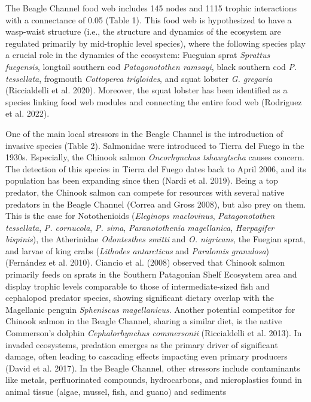 \documentclass[
]{article}
\begin{document}
The Beagle Channel food web includes 145 nodes and 1115 trophic
interactions with a connectance of 0.05 (Table 1). This food web is
hypothesized to have a wasp-waist structure (i.e., the structure and
dynamics of the ecosystem are regulated primarily by mid-trophic level
species), where the following species play a crucial role in the
dynamics of the ecosystem: Fueguian sprat \emph{Sprattus fuegensis},
longtail southern cod \emph{Patagonotothen ramsayi}, black southern cod
\emph{P. tessellata}, frogmouth \emph{Cottoperca trigloides}, and squat
lobster \emph{G. gregaria} (Riccialdelli et al. 2020). Moreover, the
squat lobster has been identified as a species linking food web modules
and connecting the entire food web (Rodriguez et al. 2022).

One of the main local stressors in the Beagle Channel is the
introduction of invasive species (Table 2). Salmonidae were introduced
to Tierra del Fuego in the 1930s. Especially, the Chinook salmon
\emph{Oncorhynchus tshawytscha} causes concern. The detection of this
species in Tierra del Fuego dates back to April 2006, and its population
has been expanding since then (Nardi et al. 2019). Being a top predator,
the Chinook salmon can compete for resources with several native
predators in the Beagle Channel (Correa and Gross 2008), but also prey
on them. This is the case for Notothenioids (\emph{Eleginops
maclovinus}, \emph{Patagonotothen tessellata}, \emph{P. cornucola},
\emph{P. sima}, \emph{Paranotothenia magellanica}, \emph{Harpagifer
bispinis}), the Atherinidae \emph{Odontesthes smitti} and \emph{O.
nigricans}, the Fuegian sprat, and larvae of king crabs (\emph{Lithodes
antarcticus} and \emph{Paralomis granulosa}) (Fernández et al. 2010).
Ciancio et al. (2008) observed that Chinook salmon primarily feeds on
sprats in the Southern Patagonian Shelf Ecosystem area and display
trophic levels comparable to those of intermediate-sized fish and
cephalopod predator species, showing significant dietary overlap with
the Magellanic penguin \emph{Spheniscus magellanicus}. Another potential
competitor for Chinook salmon in the Beagle Channel, sharing a similar
diet, is the native Commerson's dolphin \emph{Cephalorhynchus
commersonii} (Riccialdelli et al. 2013). In invaded ecosystems,
predation emerges as the primary driver of significant damage, often
leading to cascading effects impacting even primary producers (David et
al. 2017). In the Beagle Channel, other stressors include contaminants
like metals, perfluorinated compounds, hydrocarbons, and microplastics
found in animal tissue (algae, mussel, fish, and guano) and sediments
\end{document}
